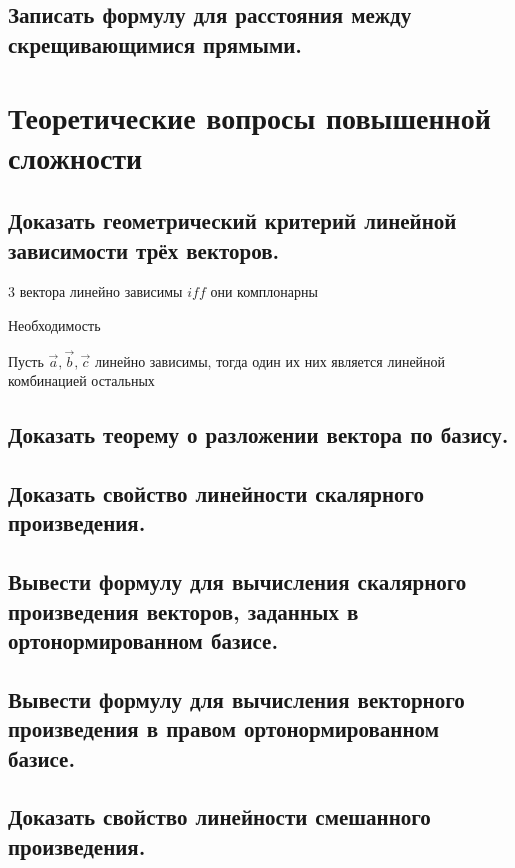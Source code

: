 \documentclass[a4paper, 10pt]{article}
\begin{document}
\subsection{Записать формулу для расстояния между скрещивающимися прямыми.}

\section{Теоретические вопросы повышенной сложности}

\subsection{Доказать геометрический критерий линейной зависимости трёх векторов.}

3 вектора линейно зависимы $iff$ они комплонарны

\begin{bf}Необходимость\end{bf}
Пусть $\vec{a}, \vec{b}, \vec{c}$ линейно зависимы, тогда один их них является линейной комбинацией
остальных


\subsection{Доказать теорему о разложении вектора по базису.}



\subsection{Доказать свойство линейности скалярного произведения.}



\subsection{Вывести формулу для вычисления скалярного произведения векторов, заданных в ортонормированном базисе.}



\subsection{Вывести формулу для вычисления векторного произведения в правом ортонормированном базисе.}



\subsection{Доказать свойство линейности смешанного произведения.}
\end{document}
